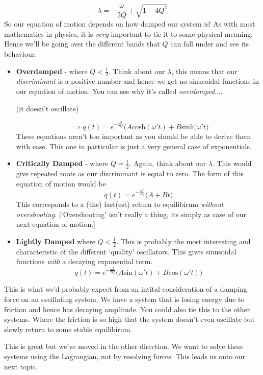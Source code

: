 \begin{equation}
\lambda = -\frac{\omega}{2Q} \pm \sqrt{1-4Q^{2}}
\end{equation}
So our equation of motion depends on how damped our system is! As with most mathematics in physics, it is \textit{very} important to tie it to some physical meaning. Hence we'll be going over the different bands that $Q$ can fall under and see its behaviour.
\begin{itemize}
\item \textbf{Overdamped} - where $Q < \frac{1}{2}$. Think about our $\lambda$, this means that our \textit{discriminant} is a positive number and hence we get no sinusoidal functions in our equation of motion. You can see why it's called \textit{overdamped}.... \begin{tiny}(it doesn't oscillate) 
\end{tiny}
\begin{equation}
\implies q(t) = e^{-\frac{\omega t}{2Q}}\Big(A\textrm{cosh}(\omega't) + B\textrm{sinh}(\omega't\Big)
\end{equation}
These equations aren't too important as you should be able to derive them with ease. This one in particular is just a very general case of exponentials. 
\item \textbf{Critically Damped} - where $Q = \frac{1}{2}$. Again, think about our $\lambda$. This would give repeated roots as our discriminant is equal to zero. The form of this equation of motion would be 
\begin{equation}
q(t) = e^{-\frac{\omega t}{2Q}}\Big(A+Bt\Big)
\end{equation}
This corresponds to a (the) fast(est) return to equilibirum \textit{without overshooting}. [`Overshooting' isn't really a thing, its simply as case of our next equation of motion.] 
\item \textbf{Lightly Damped} where $Q < \frac{1}{2}$. This is probably the most interesting and characteristic of the different `quality' oscillators. This gives sinusoidal functions \textit{with} a decaying exponential term.
\begin{equation}
q(t) = e^{-\frac{\omega t}{2Q}}\Big(A\textrm{sin}(\omega' t) + B\textrm{cos}(\omega 't)\Big)
\end{equation}
\end{itemize}
This is what we'd probably expect from an intital consideration of a damping force on an oscillating system. We have a system that is losing energy due to friction and hence has decaying amplitude. You could also tie this to the other systems. Where the friction is so high that the system doesn't even oscillate but slowly return to some stable equilibirum. \par This is great \textrm{but} we've moved in the other direction. We want to solve these systems using the Lagrangian, not by resolving forces. This leads us onto our next topic.
